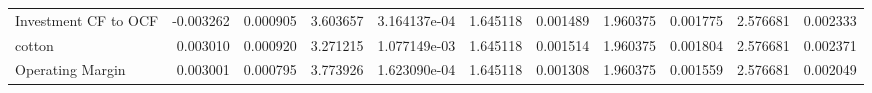 \documentclass[12pt,a4paper,english]{article}
\begin{document}
{{\begin{tabular}{@{}lrrrrrrrrrr@{}}
			Investment CF to OCF           & -0.003262                & 0.000905                    & 3.603657                  & 3.164137e-04                 & 1.645118                      & 0.001489                      & 1.960375                     & 0.001775                     & 2.576681                     & 0.002333                     \\
			cotton                         & 0.003010                 & 0.000920                    & 3.271215                  & 1.077149e-03                 & 1.645118                      & 0.001514                      & 1.960375                     & 0.001804                     & 2.576681                     & 0.002371                     \\
			Operating Margin               & 0.003001                 & 0.000795                    & 3.773926                  & 1.623090e-04                 & 1.645118                      & 0.001308                      & 1.960375                     & 0.001559                     & 2.576681                     & 0.002049                     \\ \bottomrule
		\end{tabular}%
	}
}
\end{document}
